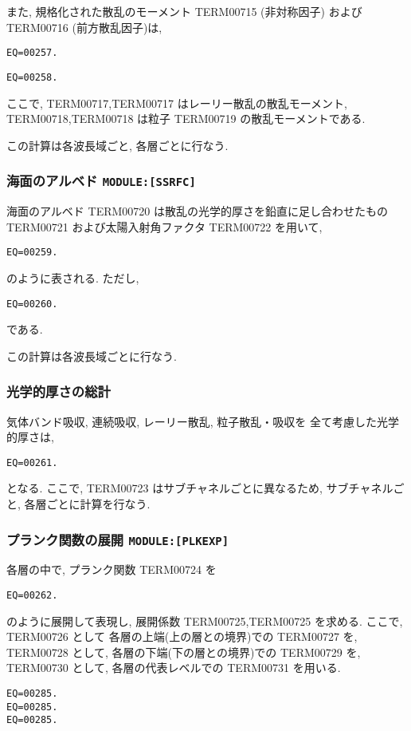また, 規格化された散乱のモーメント 
TERM00715 (非対称因子) および TERM00716 (前方散乱因子)は,
\begin{verbatim}
EQ=00257.
\end{verbatim}
\begin{verbatim}
EQ=00258.
\end{verbatim}
ここで, TERM00717,TERM00717 はレーリー散乱の散乱モーメント,
TERM00718,TERM00718 は粒子 TERM00719 の散乱モーメントである.

この計算は各波長域ごと, 各層ごとに行なう.

\subsubsection{海面のアルベド \texttt{MODULE:[SSRFC]}}

海面のアルベド TERM00720 は散乱の光学的厚さを鉛直に足し合わせたもの
TERM00721 および太陽入射角ファクタ TERM00722 を用いて,
\begin{verbatim}
EQ=00259.
\end{verbatim}
のように表される.
ただし,
\begin{verbatim}
EQ=00260.
\end{verbatim}
である.

この計算は各波長域ごとに行なう.

\subsubsection{光学的厚さの総計}

気体バンド吸収, 連続吸収, レーリー散乱, 粒子散乱・吸収を
全て考慮した光学的厚さは, 
%
\begin{verbatim}
EQ=00261.
\end{verbatim}
%
となる. ここで, TERM00723 はサブチャネルごとに異なるため,
サブチャネルごと, 各層ごとに計算を行なう.

\subsubsection{プランク関数の展開 \texttt{MODULE:[PLKEXP]}}

各層の中で, プランク関数 TERM00724 を
\begin{verbatim}
EQ=00262.
\end{verbatim}
のように展開して表現し, 展開係数 TERM00725,TERM00725 を求める.
ここで, TERM00726 として
各層の上端(上の層との境界)での TERM00727 を,
TERM00728 として, 各層の下端(下の層との境界)での TERM00729 を,
TERM00730 として, 各層の代表レベルでの TERM00731 を用いる.
\begin{verbatim}
EQ=00285.
EQ=00285.
EQ=00285.
\end{verbatim}

